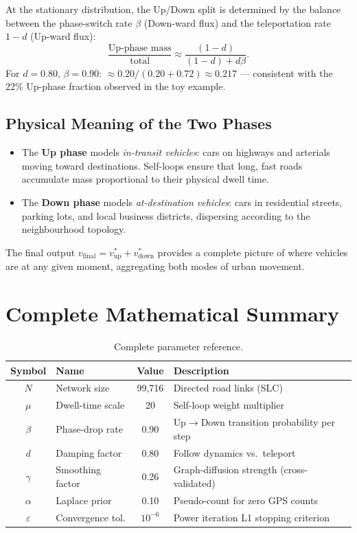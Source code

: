 \documentclass[12pt,a4paper]{article}
\theoremstyle{definition}
\theoremstyle{plain}
\newcommand{\vup}{v_{\mathrm{up}}}
\newcommand{\vdown}{v_{\mathrm{down}}}
\newcommand{\vf}{v_{\mathrm{final}}}
\begin{document}
At the stationary distribution, the Up/Down split is determined by the balance between
the phase-switch rate $\beta$ (Down-ward flux) and the teleportation rate $1-d$
(Up-ward flux):
\[
  \frac{\text{Up-phase mass}}{\text{total}} \approx \frac{(1-d)}{(1-d) + d\beta}.
\]
For $d=0.80$, $\beta=0.90$: $\approx 0.20/(0.20+0.72) \approx 0.217$ --- consistent
with the 22\% Up-phase fraction observed in the toy example.

\subsection{Physical Meaning of the Two Phases}

\begin{itemize}
  \item The \textbf{Up phase} models \emph{in-transit vehicles}: cars on highways and
    arterials moving toward destinations. Self-loops ensure that long, fast roads
    accumulate mass proportional to their physical dwell time.
  \item The \textbf{Down phase} models \emph{at-destination vehicles}: cars in
    residential streets, parking lots, and local business districts, dispersing
    according to the neighbourhood topology.
\end{itemize}

The final output $\vf = \vup^* + \vdown^*$ provides a complete picture of where vehicles
are at any given moment, aggregating both modes of urban movement.

\section{Complete Mathematical Summary}
\label{sec:summary}

\begin{table}[H]
  \centering
  \caption{Complete parameter reference.}
  \label{tab:params}
  \begin{tabular}{@{}clcp{5.5cm}@{}}
    \toprule
    Symbol & Name & Value & Description\\
    \midrule
    $N$ & Network size & 99{,}716 & Directed road links (SLC)\\
    $\mu$ & Dwell-time scale & 20 & Self-loop weight multiplier\\
    $\beta$ & Phase-drop rate & 0.90 & Up$\to$Down transition probability per step\\
    $d$ & Damping factor & 0.80 & Follow dynamics vs.\ teleport\\
    $\gamma$ & Smoothing factor & 0.26 & Graph-diffusion strength (cross-validated)\\
    $\alpha$ & Laplace prior & 0.10 & Pseudo-count for zero GPS counts\\
    $\varepsilon$ & Convergence tol. & $10^{-6}$ & Power iteration L1 stopping criterion\\
    \bottomrule
  \end{tabular}
\end{table}
\end{document}
